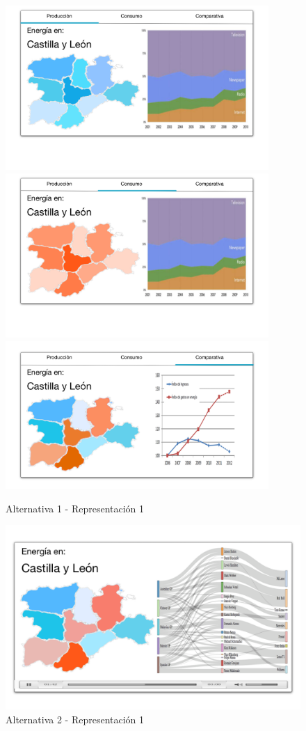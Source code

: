 \documentclass[11pt,spanish]{article}
\begin{document}
			\begin{figure}[H]
				\centering
				\includegraphics[width=100mm]{../res/design2-1.png}
				\includegraphics[width=100mm]{../res/design2-2.png}
				\includegraphics[width=100mm]{../res/design2-3.png}
				\caption{Alternativa 1 - Representación 1 \label{sketch1}}
			\end{figure}
		
			\begin{figure}[H]
				\centering
				\includegraphics[width=130mm]{../res/design3.png}
				\caption{Alternativa 2 - Representación 1 \label{sketch21}}
			\end{figure}
		
\end{document}
